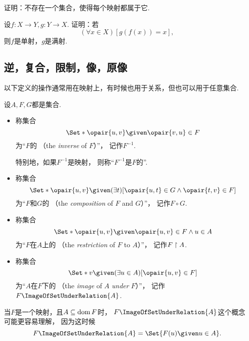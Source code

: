 \begin{example}
证明：不存在一个集合，使得每个映射都属于它.
\end{example}

\begin{example}
设\(f\colon X \to Y,
g\colon Y \to X\).
证明：若\[
	(\forall x \in X)[g(f(x)) = x],
\]
则\(f\)是单射，\(g\)是满射.
\end{example}

\subsection{逆，复合，限制，像，原像}
以下定义的操作通常用在映射上，有时候也用于关系，但也可以用于任意集合.
\begin{definition}\label{definition:映射.逆-复合-限制-像}
设\(A,F,G\)都是集合.
\begin{itemize}
	\item 称集合\[
		\Set*{ \opair{u,v} \given \opair{v,u} \in F }
	\]为“\(F\)的%
	（the \emph{inverse} of \(F\)）”，
	记作\(F^{-1}\).

	特别地，如果\(F^{-1}\)是映射，
	则称“\(F^{-1}\)是\(F\)的”.

	\item 称集合\[
		\Set*{ \opair{u,v} \given (\exists t)[\opair{u,t} \in G \land \opair{t,v} \in F] }
	\]为“\(F\)和\(G\)的%
	（the \emph{composition} of \(F\) and \(G\)）”，
	记作\(F \circ G\).

	\item 称集合\[
		\Set*{ \opair{u,v} \given \opair{u,v} \in F \land u \in A }
	\]为“\(F\)在\(A\)上的%
	（the \emph{restriction} of \(F\) to \(A\)）”，
	记作\(F \upharpoonright A\).

	\item 称集合\[
		\Set*{ v \given (\exists u \in A)[\opair{u,v} \in F] }
	\]为“\(A\)在\(F\)下的%
	（the \emph{image} of \(A\) \emph{under} \(F\)）”，
	记作\(F\ImageOfSetUnderRelation{A}\).
\end{itemize}
\end{definition}

当\(F\)是一个映射，且\(A \subseteq \operatorname{dom} F\)时，
\(F\ImageOfSetUnderRelation{A}\)这个概念可能更容易理解，
因为这时候\[
	F\ImageOfSetUnderRelation{A}
	= \Set{ F(u) \given u \in A }.
\]

